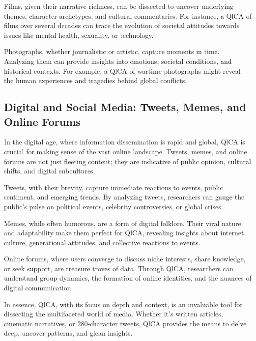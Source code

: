 \documentclass[
  b5paper]{book}
\begin{document}
Films, given their narrative richness, can be dissected to uncover underlying themes, character archetypes, and cultural commentaries. For instance, a QlCA of films over several decades can trace the evolution of societal attitudes towards issues like mental health, sexuality, or technology.

Photographs, whether journalistic or artistic, capture moments in time. Analyzing them can provide insights into emotions, societal conditions, and historical contexts. For example, a QlCA of wartime photographs might reveal the human experiences and tragedies behind global conflicts.

\hypertarget{digital-and-social-media-tweets-memes-and-online-forums}{%
\subsection*{Digital and Social Media: Tweets, Memes, and Online Forums}\label{digital-and-social-media-tweets-memes-and-online-forums}}

In the digital age, where information dissemination is rapid and global, QlCA is crucial for making sense of the vast online landscape. Tweets, memes, and online forums are not just fleeting content; they are indicative of public opinion, cultural shifts, and digital subcultures.

Tweets, with their brevity, capture immediate reactions to events, public sentiment, and emerging trends. By analyzing tweets, researchers can gauge the public's pulse on political events, celebrity controversies, or global crises.

Memes, while often humorous, are a form of digital folklore. Their viral nature and adaptability make them perfect for QlCA, revealing insights about internet culture, generational attitudes, and collective reactions to events.

Online forums, where users converge to discuss niche interests, share knowledge, or seek support, are treasure troves of data. Through QlCA, researchers can understand group dynamics, the formation of online identities, and the nuances of digital communication.

In essence, QlCA, with its focus on depth and context, is an invaluable tool for dissecting the multifaceted world of media. Whether it's written articles, cinematic narratives, or 280-character tweets, QlCA provides the means to delve deep, uncover patterns, and glean insights.
\end{document}
